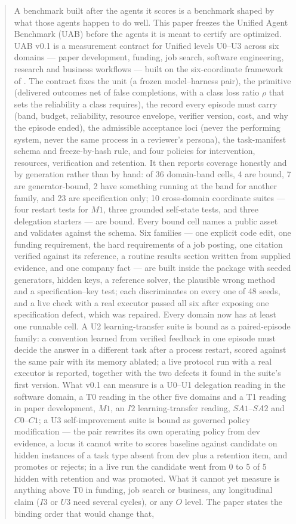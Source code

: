 \begin{abstract}
A benchmark built after the agents it scores is a benchmark shaped by what those agents happen to do well. This paper freezes the Unified Agent Benchmark (UAB) before the agents it is meant to certify are optimized. UAB v0.1 is a measurement contract for Unified levels U0--U3 across six domains --- paper development, funding, job search, software engineering, research and business workflows --- built on the six-coordinate framework of \citet{yang2026unified}. The contract fixes the unit (a frozen model--harness pair), the primitive (delivered outcomes net of false completions, with a class loss ratio $\rho$ that sets the reliability a class requires), the record every episode must carry (band, budget, reliability, resource envelope, verifier version, cost, and why the episode ended), the admissible acceptance loci (never the performing system, never the same process in a reviewer's persona), the task-manifest schema and freeze-by-hash rule, and four policies for intervention, resources, verification and retention. It then reports coverage honestly and by generation rather than by hand: of 36 domain-band cells, 4 are bound, 7 are generator-bound, 2 have something running at the band for another family, and 23 are specification only; 10 cross-domain coordinate suites --- four restart tests for $M1$, three grounded self-state tests, and three delegation starters --- are bound. Every bound cell names a public asset and validates against the schema. Six families --- one explicit code edit, one funding requirement, the hard requirements of a job posting, one citation verified against its reference, a routine results section written from supplied evidence, and one company fact --- are built inside the package with seeded generators, hidden keys, a reference solver, the plausible wrong method and a specification--key test; each discriminates on every one of 48 seeds, and a live check with a real executor passed all six after exposing one specification defect, which was repaired. Every domain now has at least one runnable cell. A U2 learning-transfer suite is bound as a paired-episode family: a convention learned from verified feedback in one episode must decide the answer in a different task after a process restart, scored against the same pair with its memory ablated; a live protocol run with a real executor is reported, together with the two defects it found in the suite's first version. What v0.1 can measure is a U0--U1 delegation reading in the software domain, a T0 reading in the other five domains and a T1 reading in paper development, $M1$, an $I2$ learning-transfer reading, $SA1$--$SA2$ and $C0$--$C1$; a U3 self-improvement suite is bound as governed policy modification --- the pair rewrites its own operating policy from dev evidence, a locus it cannot write to scores baseline against candidate on hidden instances of a task type absent from dev plus a retention item, and promotes or rejects; in a live run the candidate went from 0 to 5 of 5 hidden with retention and was promoted. What it cannot yet measure is anything above T0 in funding, job search or business, any longitudinal claim ($I3$ or $U3$ need several cycles), or any $O$ level. The paper states the binding order that would change that, 
\end{abstract}
